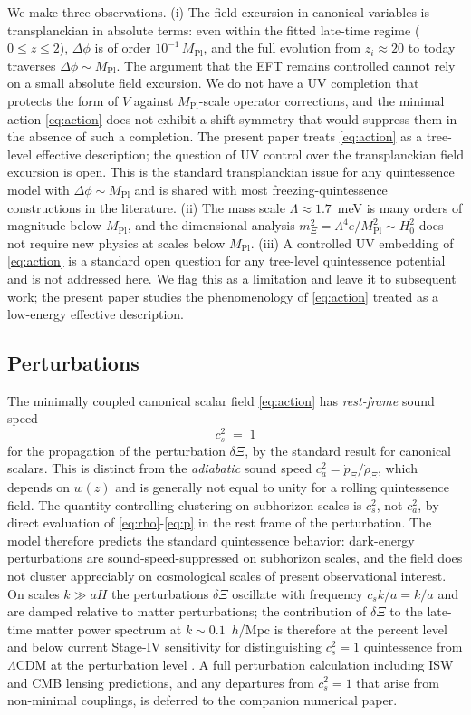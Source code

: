 \documentclass[11pt,reqno]{amsart}
\theoremstyle{plain}
\theoremstyle{definition}
\theoremstyle{remark}
\newcommand{\Pl}{\mathrm{Pl}}
\begin{document}
We make three observations. (i) The field excursion in canonical
variables is transplanckian in absolute terms: even within the
fitted late-time regime ($0 \le z \le 2$), $\Delta\phi$ is of order
$10^{-1}\,M_\Pl$, and the full evolution from $z_i \approx 20$
to today traverses $\Delta\phi \sim M_\Pl$. The argument that the
EFT remains controlled cannot rely on a small absolute field
excursion. We do not have a UV completion that protects the form
of $V$ against $M_\Pl$-scale operator corrections, and the minimal
action \eqref{eq:action} does not exhibit a shift symmetry that
would suppress them in the absence of such a completion. The
present paper treats \eqref{eq:action} as a tree-level effective
description; the question of UV control over the transplanckian
field excursion is open. This is the standard transplanckian
issue for any quintessence model with $\Delta\phi \sim M_\Pl$ and
is shared with most freezing-quintessence constructions in the
literature.
(ii) The mass scale $\Lambda \approx 1.7$~meV is many
orders of magnitude below $M_\Pl$, and the dimensional analysis
$m_\Xi^{2} = \Lambda^{4} e / M_\Pl^{2} \sim H_0^{2}$ does not require
new physics at scales below $M_\Pl$. (iii) A controlled UV embedding
of \eqref{eq:action} is a standard open question for any tree-level
quintessence potential and is not addressed here. We flag this as a
limitation and leave it to subsequent work; the present paper studies
the phenomenology of \eqref{eq:action} treated as a low-energy
effective description.

\subsection{Perturbations}\label{sec:perts}

The minimally coupled canonical scalar field \eqref{eq:action} has
\emph{rest-frame} sound speed
\[
  c_{s}^{2} \;=\; 1
\]
for the propagation of the perturbation $\delta\Xi$, by the standard
result for canonical scalars. This is
distinct from the \emph{adiabatic} sound speed
$c_{a}^{2} = \dot p_\Xi/\dot\rho_\Xi$, which depends on $w(z)$ and is
generally not equal to unity for a rolling quintessence field. The
quantity controlling clustering on subhorizon scales is $c_{s}^{2}$,
not $c_{a}^{2}$, by direct evaluation of \eqref{eq:rho}-\eqref{eq:p}
in the rest frame of the perturbation.
The model therefore predicts the standard quintessence behavior: dark-energy
perturbations are sound-speed-suppressed on subhorizon scales, and the
field does not cluster appreciably on cosmological scales of present
observational interest. On scales $k \gg a H$ the perturbations $\delta\Xi$
oscillate with frequency $c_s k/a = k/a$ and are damped relative to matter
perturbations; the contribution of $\delta\Xi$ to the late-time matter
power spectrum at $k \sim 0.1$~$h$/Mpc is therefore at the percent level
and below current Stage-IV sensitivity for distinguishing $c_s^{2} = 1$
quintessence from $\Lambda$CDM at the perturbation level
\cite{ShajibFrieman2025,Turyshev2026Review}. A full perturbation
calculation including ISW and CMB lensing predictions, and any departures
from $c_s^{2} = 1$ that arise from non-minimal couplings, is deferred to
the companion numerical paper.
\end{document}
